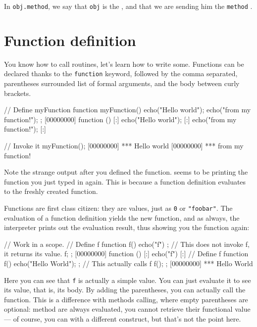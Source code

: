 In \lstinline|obj.method|, we say that \lstinline{obj} is the
, and that we are sending him the \lstinline{method}
.

\section{Function definition}

You know how to call routines, let's learn how to write
some. Functions can be declared thanks to the \lstinline{function}
keyword, followed by the comma separated, parentheses surrounded list
of formal arguments, and the body between curly brackets.

\begin{urbiscript}[firstnumber=last]
// Define myFunction
function myFunction()
{
  echo("Hello world");
  echo("from my function!");
};
[00000000] function () {
[:]  echo("Hello world");
[:]  echo("from my function!");
[:]}

// Invoke it
myFunction();
[00000000] *** Hello world
[00000000] *** from my function!
\end{urbiscript}

Note the strange output after you defined the function. \us seems to
be printing the function you just typed in again. This is because
a function definition evaluates to the freshly created function.

Functions are first class citizen: they are values, just as
\lstinline{0} or \lstinline{"foobar"}.  The evaluation of a function
definition yields the new function, and as always, the interpreter
prints out the evaluation result, thus showing you the function
again:

\begin{urbiscript}[firstnumber=last]
// Work in a scope.
{
  // Define f
  function f()
  {
    echo("f")
  };
  // This does not invoke f, it returns its value.
  f;
};
[00000000] function () {
[:]  echo("f")
[:]}
{
  // Define f
  function f()
  {
    echo("Hello World");
  };
  // This actually calls f
  f();
};
[00000000] *** Hello World
\end{urbiscript}

Here you can see that \lstinline{f} is actually a simple value. You can just
evaluate it to see its value, that is, its body. By adding the
parentheses, you can actually call the function. This is a difference
with methods calling, where empty parentheses are optional: method are
always evaluated, you cannot retrieve their functional value --- of
course, you can with a different construct, but that's not the point
here.

